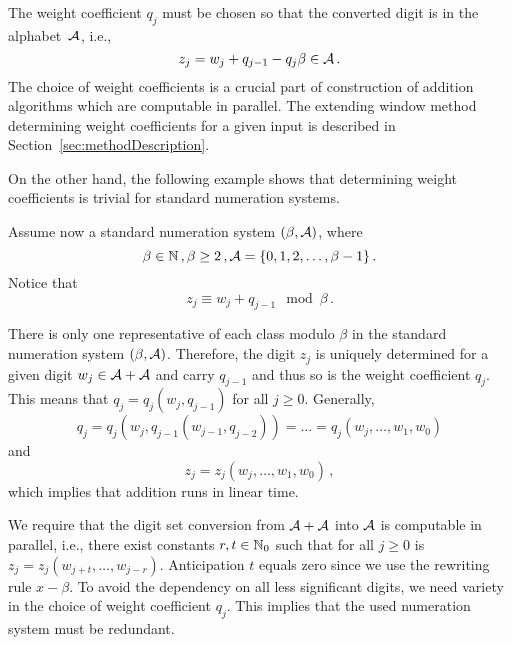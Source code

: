    The weight coefficient $q_j$ must be chosen so that the converted digit is in the alphabet~$\mathcal{A}$, i.e., 
    \begin{equation}
    \label{eq:conversionFormula}
        z_j=w_j + q_{j-1} - q_j \beta \in \mathcal{A}\,.
    \end{equation} 
    The choice of weight coefficients is a crucial part of construction of addition algorithms which are computable in parallel. The extending window method determining weight coefficients for a given input is described in Section~\ref{sec:methodDescription}.
    
    
     On the other hand, the following example shows that determining weight coefficients is trivial for standard numeration systems.
     
     \begin{exmp}
        Assume now a standard numeration system $(\beta, \mathcal{A})$, where
  $$
    \beta \in \mathbb{N}\,,\beta  \geq 2\,, \mathcal{A} = \{0, 1, 2,\dots, \beta -1 \}\,.
  $$ 
       Notice that
    $$
        z_j \equiv w_j+q_{j-1} \mod \beta\,. 
    $$
  
  There is only one representative of each class modulo  $\beta$ in the standard numeration system $(\beta, \mathcal{A})$. Therefore, the digit $z_j$ is uniquely determined for a given digit $w_j \in \mathcal{A}+\mathcal{A}$ and carry $q_{j-1}$ and thus so is the weight coefficient $q_j$. This means that $q_j=q_j(w_j,q_{j-1})$ for all $j\geq 0$. Generally,
  $$
  q_j=q_j(w_j,q_{j-1}(w_{j-1},q_{j-2}))=\dots =q_j(w_j ,\dots , w_1, w_0)
  $$
  and
  $$
  z_j=z_j(w_j ,\dots , w_1, w_0)\,,
  $$
  which implies that addition runs in linear time.
     
     \end{exmp}
  
  We require that the digit set conversion from $\mathcal{A}+\mathcal{A}$ into $\mathcal{A}$ is computable in parallel, i.e., there exist constants $r,t \in \mathbb{N}_0$ such that for all $j\geq 0$ is $z_j=z_j(w_{j+t},\dots,w_{j-r})$. Anticipation $t$ equals zero since we use the rewriting rule $x-\beta$. To avoid the dependency on all less significant digits, we need variety in the choice of weight coefficient $q_j$. This implies that the used numeration system must be redundant.
  

